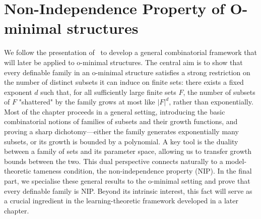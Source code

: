 \chapter{Non-Independence Property of O-minimal structures}\label{ch:nip-property}

We follow the presentation of~\cite[Chap.~5]{vandenDries1998} to develop a general combinatorial framework that will later be applied to o-minimal structures. The central aim is to show that every definable family in an o-minimal structure satisfies a strong restriction on the number of distinct subsets it can induce on finite sets: there exists a fixed exponent $d$ such that, for all sufficiently large finite sets $F$, the number of subsets of $F$ "shattered" by the family grows at most like $|F|^{d}$, rather than exponentially. Most of the chapter proceeds in a general setting, introducing the basic combinatorial notions of families of subsets and their growth functions, and proving a sharp dichotomy—either the family generates exponentially many subsets, or its growth is bounded by a polynomial. A key tool is the duality between a family of sets and its parameter space, allowing us to transfer growth bounds between the two. This dual perspective connects naturally to a model-theoretic tameness condition, the non-independence property (NIP). In the final part, we specialise these general results to the o-minimal setting and prove that every definable family is NIP. Beyond its intrinsic interest, this fact will serve as a crucial ingredient in the learning-theoretic framework developed in a later chapter.






